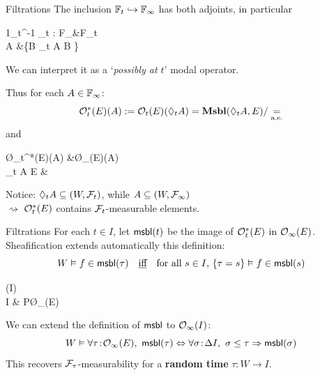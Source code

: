 \begin{frame}{Filtrations}
	The inclusion $\mathbb{F}_t \hookrightarrow \mathbb{F}_\infty$ has both adjoints, in particular
	\begin{eqalign*}
		1_t^{-1} \dashv \lozenge_t : \alg F_\infty &\longto \alg F_t\\
						A	&\longmapsto \bigwedge \{B \in \F_t \suchthat A \leq B \}
	\end{eqalign*}
	{\color{colorgold}We can interpret it as a `\textit{possibly at $t$}' modal operator.}

	\vfill
	Thus for each $A \in \mathbb{F}_\infty$:
	\begin{equation*}
		\mathcal{O}_t^*(E)(A) := \mathcal{O}_t(E)(\lozenge_t A) = \mathbf{Msbl}(\lozenge_t A, E) / \underset{\text{a.e.}}{=}
	\end{equation*}
	and
	\begin{eqalign*}
		\O_t^*(E)(A) &\longto \O_\infty(E)(A)\\
		{\color{colorgold}\lozenge_t A  E} &\longmapsto {\color{colorgold}A \into \lozenge_t A \nto{f} E}
	\end{eqalign*}
	Notice: $\lozenge_t A \subseteq (W, \mathcal{F}_t)$, while $A \subseteq (W, \mathcal{F}_\infty)$\\
	\hspace*{3ex} {\color{colorgold}$\rightsquigarrow$ $\mathcal{O}^*_t(E)$ contains $\mathcal{F}_t$-measurable elements}.
\end{frame}

\begin{frame}{Filtrations}
	For each $t \in I$, let $\mathsf{msbl}(t)$ be the image of $\mathcal{O}_t^*(E)$ in $\mathcal{O}_\infty(E)$.\\[1ex]
	Sheafification extends automatically this definition:
	\begin{equation*}
		W \vDash f \in \mathsf{msbl}(\tau) \quad\text{\underline{iff}}\quad \text{for all $s \in I$, $\{\tau = s\} \vDash f \in \mathsf{msbl}(s)$}
	\end{equation*}

	\vfill
	\begin{diagram*}
		(I)  \arrow[swap]{d}{\eta_\aetop}\\
		\Delta I  \& P\O_\infty(E)
	\end{diagram*}

	\vfill
	We can extend the definition of $\mathsf{msbl}$ to $\mathcal{O}_\infty(I)$:
	\begin{equation*}
		W \forces \forall \tau \tin \O_\infty(E),\ \msbl(\tau) \Leftrightarrow \forall \sigma \tin \Delta I,\ \sigma \leq \tau \hey \msbl(\sigma)
	\end{equation*}
	This recovers $\mathcal{F}_\tau$-measurability for a \textbf{random time} $\tau : W \to I$.
\end{frame}

